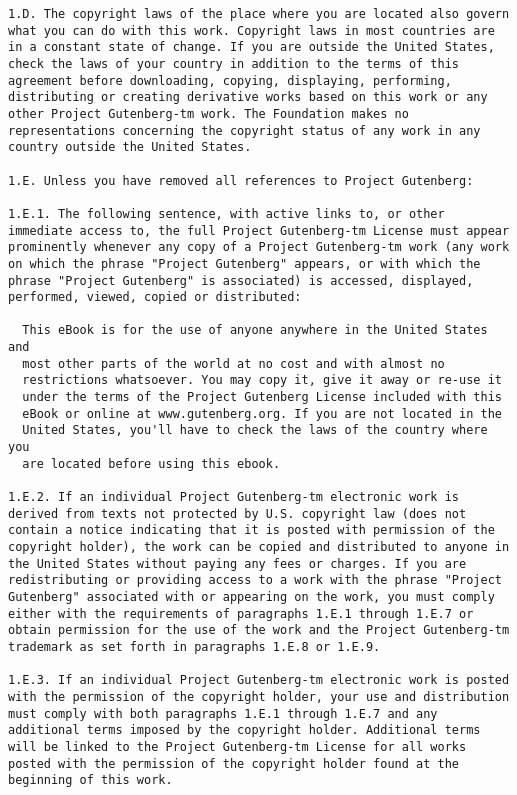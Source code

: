 \documentclass{book}[2021/07/26]
\begin{document}
\begin{mainmatter}
\begin{spacing}{1.3}
\begin{verbatim}
1.D. The copyright laws of the place where you are located also govern
what you can do with this work. Copyright laws in most countries are
in a constant state of change. If you are outside the United States,
check the laws of your country in addition to the terms of this
agreement before downloading, copying, displaying, performing,
distributing or creating derivative works based on this work or any
other Project Gutenberg-tm work. The Foundation makes no
representations concerning the copyright status of any work in any
country outside the United States.

1.E. Unless you have removed all references to Project Gutenberg:

1.E.1. The following sentence, with active links to, or other
immediate access to, the full Project Gutenberg-tm License must appear
prominently whenever any copy of a Project Gutenberg-tm work (any work
on which the phrase "Project Gutenberg" appears, or with which the
phrase "Project Gutenberg" is associated) is accessed, displayed,
performed, viewed, copied or distributed:

  This eBook is for the use of anyone anywhere in the United States and
  most other parts of the world at no cost and with almost no
  restrictions whatsoever. You may copy it, give it away or re-use it
  under the terms of the Project Gutenberg License included with this
  eBook or online at www.gutenberg.org. If you are not located in the
  United States, you'll have to check the laws of the country where you
  are located before using this ebook.

1.E.2. If an individual Project Gutenberg-tm electronic work is
derived from texts not protected by U.S. copyright law (does not
contain a notice indicating that it is posted with permission of the
copyright holder), the work can be copied and distributed to anyone in
the United States without paying any fees or charges. If you are
redistributing or providing access to a work with the phrase "Project
Gutenberg" associated with or appearing on the work, you must comply
either with the requirements of paragraphs 1.E.1 through 1.E.7 or
obtain permission for the use of the work and the Project Gutenberg-tm
trademark as set forth in paragraphs 1.E.8 or 1.E.9.

1.E.3. If an individual Project Gutenberg-tm electronic work is posted
with the permission of the copyright holder, your use and distribution
must comply with both paragraphs 1.E.1 through 1.E.7 and any
additional terms imposed by the copyright holder. Additional terms
will be linked to the Project Gutenberg-tm License for all works
posted with the permission of the copyright holder found at the
beginning of this work.


\end{verbatim}
\end{spacing}
\end{mainmatter}
\end{document}
